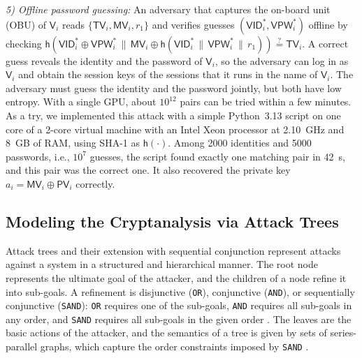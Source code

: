 \documentclass[journal]{IEEEtran}
\theoremstyle{plain}
\theoremstyle{definition}
\newcommand{\Veh}{\mathsf{V}}            %
\newcommand{\VID}{\mathsf{VID}}          %
\newcommand{\VPW}{\mathsf{VPW}}          %
\newcommand{\TV}{\mathsf{TV}}            %
\newcommand{\PV}{\mathsf{PV}}            %
\newcommand{\MV}{\mathsf{MV}}
\newcommand{\h}{\mathsf{h}}              %
\newcommand{\cat}{\,\|\,}               %
\newcommand{\chk}{\stackrel{?}{=}}
\begin{document}
\emph{5) Offline password guessing:} An adversary that captures the on-board unit (OBU) of $\Veh_i$ reads $\{\TV_i,\MV_i,r_1\}$ and verifies guesses $(\VID_i^*,\VPW_i^*)$ offline by checking $\h(\VID_i^*\oplus\VPW_i^*\cat\MV_i\oplus\h(\VID_i^*\cat\VPW_i^*\cat r_1))\chk\TV_i$. A correct guess reveals the identity and the password of $\Veh_i$, so the adversary can log in as $\Veh_i$ and obtain the session keys of the sessions that it runs in the name of $\Veh_i$. The adversary must guess the identity and the password jointly, but both have low entropy. With a single GPU, about $10^{12}$ pairs can be tried within a few minutes. As a try, we implemented this attack with a simple Python~3.13 script on one core of a 2-core virtual machine with an Intel Xeon processor at 2.10~GHz and 8~GB of RAM, using SHA-1 as $\h(\cdot)$. Among 2000 identities and 5000 passwords, i.e., $10^7$ guesses, the script found exactly one matching pair in 42~s, and this pair was the correct one. It also recovered the private key $a_i=\MV_i\oplus\PV_i$ correctly.

\subsection{Modeling the Cryptanalysis via Attack Trees}\label{sec:at}
Attack trees \cite{schneier1999attack} and their extension with sequential conjunction \cite{jhawar2015attack,gadyatskaya2017refinement} represent attacks against a system in a structured and hierarchical manner. The root node represents the ultimate goal of the attacker, and the children of a node refine it into sub-goals. A refinement is disjunctive (\texttt{OR}), conjunctive (\texttt{AND}), or sequentially conjunctive (\texttt{SAND}): \texttt{OR} requires one of the sub-goals, \texttt{AND} requires all sub-goals in any order, and \texttt{SAND} requires all sub-goals in the given order \cite{kordy2014attack}. The leaves are the basic actions of the attacker, and the semantics of a tree is given by sets of series-parallel graphs, which capture the order constraints imposed by \texttt{SAND} \cite{jhawar2015attack}.
\end{document}
